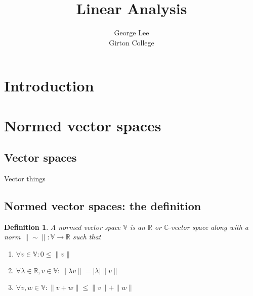 \documentclass{article}
\title{Linear Analysis}
\author{George Lee\\Girton College}
\newtheorem{definition}{Definition}[subsection]
\begin{document}
\maketitle
\section{Introduction}
\section{Normed vector spaces}
\subsection{Vector spaces}
Vector things
\subsection{Normed vector spaces: the definition}
\begin{definition}
  A normed vector space $\mathbb V$ is an $\mathbb R$ or $\mathbb C$-vector space along with a norm $\|\sim\|:\mathbb V \rightarrow \mathbb R$ such that
  \begin{enumerate}
    \item $\forall v\in\mathbb V :0\leq\|v\|$
    \item $\forall\lambda\in\mathbb R,v\in\mathbb V:\|\lambda v\|=|\lambda|\|v\|$
    \item $\forall v,w\in\mathbb V:\|v+w\|\leq\|v\|+\|w\|$
  \end{enumerate}
\end{definition}
\end{document}
